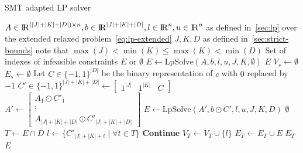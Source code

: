 \documentclass[runningheads]{llncs}
\begin{document}
\begin{algorithm}
    \caption{SMT adapted LP solver}\label{alg:theory-solver}
    \begin{algorithmic}[1]
        \Require $A \in {\rm I\!R}^{(|J| + |K| + |D|) \times n}, b \in {\rm I\!R}^{|J| + |K| + |D|}, l \in {\rm I\!R}^n, u \in {\rm I\!R}^n$ \newline
        \qquad as defined in~\autoref{sec:lp} over the extended relaxed problem~\eqref{eq:lp-extended}
        \Require $J, K, D$ as defined in~\autoref{sec:strict-bounds} \newline
        \qquad note that $\max(J) < \min(K) \le \max(K) < \min(D)$
        \Ensure Set of indexes of infeasible constraints $E$ or $\emptyset$
        \State $E \gets \text{LpSolve}(A, b, l, u, J, K, \emptyset)$ 
         \label{alg:theory-solver:infeasible}
        \State \Return $E$
        \EndIf
        \State $V_s \gets \emptyset$
        \State $E_s \gets \emptyset$
        \EndFor
         \label{alg:theory-solver:loop}
        \State Let $C \in \{-1, 1\}^{|D|}$ be the binary representation of $c$ with $0$ replaced by $-1$
        \State $C' \in \{-1, 1\}^{|J|+|K|+|D|} \gets \begin{bmatrix} 1^{|J|} & 1^{|K|} & C\end{bmatrix}$
        \State $A' \gets \begin{bmatrix}A_1 \odot C'_1 \\ \vdots \\ A_{|J|+|K|+|D|} \odot C'_{|J|+|K|+|D|}\end{bmatrix}$
        \State $E \gets \text{LpSolve}(A', b \odot C', l, u, J, K, D)$ \label{alg:theory-solver:loop-solve}
          \label{alg:theory-solver:feasible}
        \State \Return $\emptyset$
        \EndIf
        \State $T \gets E \cap D$ \label{alg:theory-solver:nq-infeasible}
        \State $l \gets \{ C'_{|J| + |K| + t} \mid \forall t \in T\}$ %
         
        \State \textbf{Continue}
        \EndIf
        \State $V_T \gets V_T \cup \{l\}$
        \State $E_T \gets E_T \cup E$ \label{alg:theory-solver:store-explanation}
          \label{alg:theory-solver:relaxed-infeasible}
        \State \Return $E_T$
        \EndIf
        \EndFor
        \State \Return $E$
    \end{algorithmic}
\end{algorithm}
\end{document}
